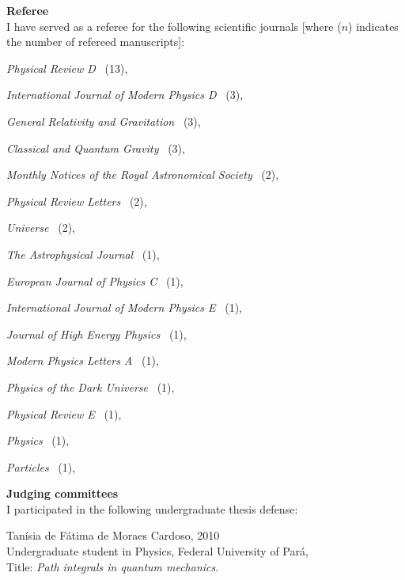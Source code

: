 \documentclass[10pt]{article}
\newcommand{\blankline}{\quad\pagebreak[3]}
\begin{document}
\textbf{Referee} \\
I have served as a referee for the following scientific journals [where ($n$)
indicates the number of refereed manuscripts]:
\blankline
\vspace{0.25cm}
\begin{innerlist}
    \item \emph{Physical Review D} \dotfill\, (13),
    \item \emph{International Journal of Modern Physics D} \dotfill\, (3),
    \item \emph{General Relativity and Gravitation} \dotfill\, (3),
    \item \emph{Classical and Quantum Gravity} \dotfill\, (3),
    \item \emph{Monthly Notices of the Royal Astronomical Society} \dotfill\, (2),
    \item \emph{Physical Review Letters} \dotfill\, (2),
    \item \emph{Universe} \dotfill\, (2),
    \item \emph{The Astrophysical Journal} \dotfill\, (1),
    \item \emph{European Journal of Physics C} \dotfill\, (1),
    \item \emph{International Journal of Modern Physics E} \dotfill\, (1),
    \item \emph{Journal of High Energy Physics} \dotfill\, (1),
    \item \emph{Modern Physics Letters A} \dotfill\, (1),
    \item \emph{Physics of the Dark Universe} \dotfill\, (1),
    \item \emph{Physical Review E} \dotfill\, (1),
    \item \emph{Physics} \dotfill\, (1),
    \item \emph{Particles} \dotfill\, (1),
\end{innerlist}

\blankline

\textbf{Judging committees} \\
I participated in the following undergraduate thesis defense:
\begin{bibenum}
    \item {Tan\'isia de F\'atima de Moraes Cardoso}, \hfill{2010} \\
        Undergraduate student in Physics, Federal University of Par\'a, \\
        Title: \emph{Path integrals in quantum mechanics}.
\end{bibenum}
\end{document}
